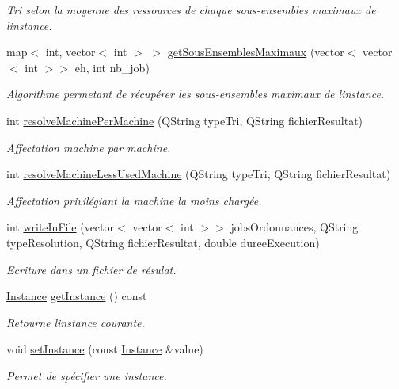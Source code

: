 \begin{DoxyCompactItemize}
\begin{DoxyCompactList}\small\item\em Tri selon la moyenne des ressources de chaque sous-\/ensembles maximaux de l\textquotesingle{}instance. \end{DoxyCompactList}\item 
map$<$ int, vector$<$ int $>$ $>$ \hyperlink{classHeuristique_a6799e05f33af7ac257ba56b9921a8baf}{get\+Sous\+Ensembles\+Maximaux} (vector$<$ vector$<$ int $>$$>$ eh, int nb\+\_\+job)
\begin{DoxyCompactList}\small\item\em Algorithme permetant de récupérer les sous-\/ensembles maximaux de l\textquotesingle{}instance. \end{DoxyCompactList}\item 
int \hyperlink{classHeuristique_a49b20cab1a9055fddf0519fe7bf99c4a}{resolve\+Machine\+Per\+Machine} (Q\+String type\+Tri, Q\+String fichier\+Resultat)
\begin{DoxyCompactList}\small\item\em Affectation machine par machine. \end{DoxyCompactList}\item 
int \hyperlink{classHeuristique_aa590500fc2368d1ea58ab483b2377fea}{resolve\+Machine\+Less\+Used\+Machine} (Q\+String type\+Tri, Q\+String fichier\+Resultat)
\begin{DoxyCompactList}\small\item\em Affectation privilégiant la machine la moins chargée. \end{DoxyCompactList}\item 
int \hyperlink{classHeuristique_adc1f4075bda4dfbf40f6ed4cc8a6c993}{write\+In\+File} (vector$<$ vector$<$ int $>$$>$ jobs\+Ordonnances, Q\+String type\+Resolution, Q\+String fichier\+Resultat, double duree\+Execution)
\begin{DoxyCompactList}\small\item\em Ecriture dans un fichier de résulat. \end{DoxyCompactList}\item 
\hyperlink{classInstance}{Instance} \hyperlink{classHeuristique_aa6eca6703702298968f03ac30c4be86f}{get\+Instance} () const
\begin{DoxyCompactList}\small\item\em Retourne l\textquotesingle{}instance courante. \end{DoxyCompactList}\item 
void \hyperlink{classHeuristique_a2b6477a1dde77d58415dd0bc75940352}{set\+Instance} (const \hyperlink{classInstance}{Instance} \&value)
\begin{DoxyCompactList}\small\item\em Permet de spécifier une instance. \end{DoxyCompactList}\end{DoxyCompactItemize}



